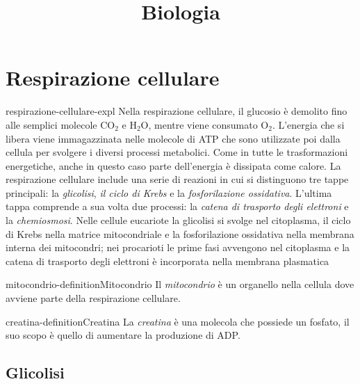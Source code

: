 \documentclass[preview]{standalone}
\begin{document}
\title{Biologia}
\genpage

\section{Respirazione cellulare}

\begin{snippet}{respirazione-cellulare-expl}
    Nella respirazione cellulare, il glucosio è demolito fino alle semplici molecole CO\({}_2\) e H\({}_2\)O,
    mentre viene consumato O\({}_2\). L'energia che si libera viene immagazzinata nelle molecole di
    ATP che sono utilizzate poi dalla cellula per svolgere i diversi processi metabolici. Come in
    tutte le trasformazioni energetiche, anche in questo caso parte dell'energia è dissipata come
    calore. La respirazione cellulare include una serie di reazioni in cui si distinguono tre tappe
    principali: la \textit{glicolisi}, \textit{il ciclo di Krebs} e la \textit{fosforilazione ossidativa}.
    L'ultima tappa comprende a sua volta due processi:
    la \textit{catena di trasporto degli elettroni} e la \textit{chemiosmosi}. Nelle cellule
    eucariote la glicolisi si svolge nel citoplasma, il ciclo di Krebs nella matrice mitocondriale e
    la fosforilazione ossidativa nella membrana interna dei mitocondri; nei procarioti le prime
    fasi avvengono nel citoplasma e la catena di trasporto degli elettroni è incorporata nella
    membrana plasmatica
\end{snippet}


\begin{snippetdefinition}{mitocondrio-definition}{Mitocondrio}
    Il \textit{mitocondrio} è un organello nella cellula dove avviene parte della respirazione cellulare.
\end{snippetdefinition}


\begin{snippetdefinition}{creatina-definition}{Creatina}
    La \textit{creatina} è una molecola che possiede un fosfato, il suo scopo è quello di aumentare la produzione di ADP.
\end{snippetdefinition}

\subsection{Glicolisi}
\end{document}
